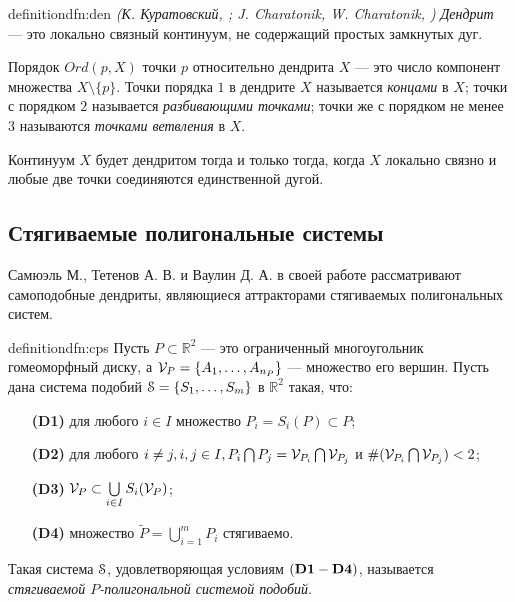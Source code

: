 \begin{restatethis}{definition}{dfn:den} %
{\em (К. Куратовский, \cite{Kur}; J. Charatonik, W. Charatonik, \cite{Char})}
{\em Дендрит} --- это локально связный континуум, не содержащий простых замкнутых дуг.     
\end{restatethis}

Порядок $Ord(p,X)$ точки $p$ относительно дендрита $X$ --- это число компонент множества $X\setminus\{p\}$.
Точки порядка $1$ в дендрите $X$ называется {\em концами} в $X$; точки с порядком  $2$ называется {\em разбивающими точками}; точки же с порядком не менее $3$ называются {\em точками ветвления} в $X$.

Континуум $X$ будет дендритом тогда и только тогда, когда $X$ локально связно и  любые две точки соединяются единственной дугой. 


\subsection{Стягиваемые полигональные системы}

Самюэль М., Тетенов А. В. и Ваулин Д. А. в своей работе \cite{STV2017} рассматривают самоподобные дендриты, являющиеся аттракторами стягиваемых полигональных систем.


\begin{restatethis}{definition}{dfn:cps} \label{dfn:cps}
Пусть $P\subset\mathbb{R}^2$ --- это ограниченный многоугольник гомеоморфный диску, а $ {\mathcal V}_P= \{A_1, \ldots, A_{n_P}\}$ --- множество его вершин.
Пусть дана система подобий ${\EuScript S} = \{S_1, \ldots, S_m\}$ в ${\mathbb{R}}^2$ такая, что:
\begin{itemize}[nolistsep]
    \item[{\bf (D1)}] для любого $i \in I$ множество $P_i = S_i (P) \subset P$; 
    \item[{\bf (D2)}] для любого $i \ne j, i, j \in I, P_i \bigcap P_j =  {\mathcal V}_{P_i} \bigcap  {\mathcal V}_{P_j}$ и $\#({\mathcal V}_{P_i} \bigcap  {\mathcal V}_{P_j})<2$;  
    \item[{\bf (D3)}] ${\mathcal V}_P \subset \bigcup \limits_{i \in I} S_i ({\mathcal V}_P)$;
    \item[{\bf (D4)}] множество $\widetilde P = \bigcup \limits_{i = 1} ^m P_i$ стягиваемо.
\end{itemize} 
Такая система  ${\EuScript S}$, удовлетворяющая условиям $\bf (D1 - D4)$, называется  {\em стягиваемой $P$-полигональной системой подобий}.
\end{restatethis}

